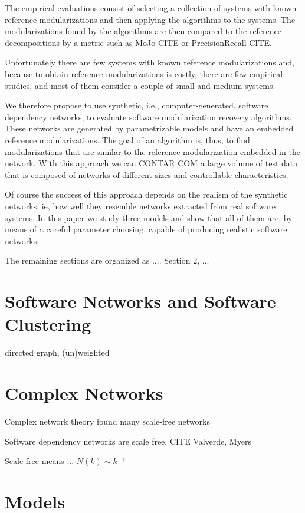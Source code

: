 The empirical evaluations consist of selecting a collection of systems with
known reference modularizations and then applying the algorithms to the systems.
The modularizations found by the algorithms are then compared to the reference
decompositions by a metric such as MoJo CITE or PrecisionRecall CITE.

Unfortunately there are few systems with known reference modularizations and,
because to obtain reference modularizations is costly, there are few empirical
studies, and most of them consider a couple of small and medium systems.

We therefore propose to use synthetic, i.e., computer-generated, software
dependency networks, to evaluate software modularization recovery algorithms.
These networks are generated by parametrizable models and have an embedded
reference modularizations. The goal of an algorithm is, thus, to find
modularizations that are similar to the reference modularization embedded in the
network. With this approach we can CONTAR COM a large volume of test data that
is composed of networks of different sizes and controllable characteristics.

Of course the success of this approach depends on the realism of the synthetic
networks, ie, how well they resemble networks extracted from real software
systems. In this paper we study three models and show that all of them are, by
means of a careful parameter choosing, capable of producing realistic software
networks.

The remaining sections are organized as .... Section 2, ...


\section{Software Networks and Software Clustering}

directed graph, (un)weighted

\section{Complex Networks}

Complex network theory found many scale-free networks

Software dependency networks are scale free. CITE Valverde, Myers

Scale free means ... $N(k) \sim k^{-\gamma}$

\section{Models}

